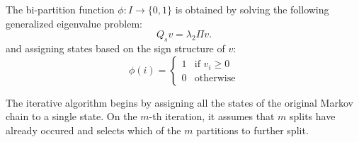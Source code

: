 The bi-partition function $\phi: I \rightarrow \{0,1\}$ is obtained by solving the following generalized eigenvalue problem:
\begin{equation}
	Q_s v = \lambda_2 \Pi v.
\end{equation}
and assigning states based on the sign structure of $v$:
\begin{equation}
	\nonumber
	\phi(i) = 
		\left\{
			\begin{array}{ll}
				1 & \mbox{if } v_i \ge 0 \\
				0 & \mbox{otherwise}
			\end{array}
		\right.
\end{equation}

 The iterative algorithm begins by assigning  all the states of the original Markov chain to a single state. On the $m$-th iteration, it assumes that $m$ splits have already occured and selects which of the $m$ partitions to further split. 


